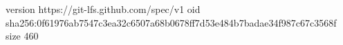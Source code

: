 version https://git-lfs.github.com/spec/v1
oid sha256:0f61976ab7547c3ea32c6507a68b0678ff7d53e484b7badae34f987c67c3568f
size 460
